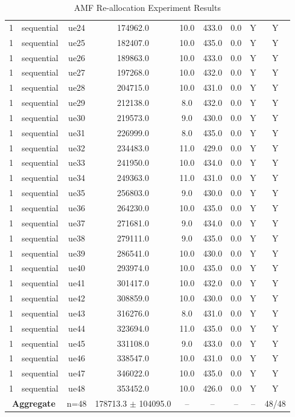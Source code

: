 \begin{table}[ht]
\begin{tabular}{|c|c|c|c|c|c|c|c|c|}
1 & sequential & ue24 & 174962.0 & 10.0 & 433.0 & 0.0 & Y & Y \\
1 & sequential & ue25 & 182407.0 & 10.0 & 435.0 & 0.0 & Y & Y \\
1 & sequential & ue26 & 189863.0 & 10.0 & 433.0 & 0.0 & Y & Y \\
1 & sequential & ue27 & 197268.0 & 10.0 & 432.0 & 0.0 & Y & Y \\
1 & sequential & ue28 & 204715.0 & 10.0 & 431.0 & 0.0 & Y & Y \\
1 & sequential & ue29 & 212138.0 & 8.0 & 432.0 & 0.0 & Y & Y \\
1 & sequential & ue30 & 219573.0 & 9.0 & 430.0 & 0.0 & Y & Y \\
1 & sequential & ue31 & 226999.0 & 8.0 & 435.0 & 0.0 & Y & Y \\
1 & sequential & ue32 & 234483.0 & 11.0 & 429.0 & 0.0 & Y & Y \\
1 & sequential & ue33 & 241950.0 & 10.0 & 434.0 & 0.0 & Y & Y \\
1 & sequential & ue34 & 249363.0 & 11.0 & 431.0 & 0.0 & Y & Y \\
1 & sequential & ue35 & 256803.0 & 9.0 & 430.0 & 0.0 & Y & Y \\
1 & sequential & ue36 & 264230.0 & 10.0 & 435.0 & 0.0 & Y & Y \\
1 & sequential & ue37 & 271681.0 & 9.0 & 434.0 & 0.0 & Y & Y \\
1 & sequential & ue38 & 279111.0 & 9.0 & 435.0 & 0.0 & Y & Y \\
1 & sequential & ue39 & 286541.0 & 10.0 & 430.0 & 0.0 & Y & Y \\
1 & sequential & ue40 & 293974.0 & 10.0 & 435.0 & 0.0 & Y & Y \\
1 & sequential & ue41 & 301417.0 & 10.0 & 432.0 & 0.0 & Y & Y \\
1 & sequential & ue42 & 308859.0 & 10.0 & 430.0 & 0.0 & Y & Y \\
1 & sequential & ue43 & 316276.0 & 8.0 & 431.0 & 0.0 & Y & Y \\
1 & sequential & ue44 & 323694.0 & 11.0 & 435.0 & 0.0 & Y & Y \\
1 & sequential & ue45 & 331108.0 & 9.0 & 433.0 & 0.0 & Y & Y \\
1 & sequential & ue46 & 338547.0 & 10.0 & 431.0 & 0.0 & Y & Y \\
1 & sequential & ue47 & 346022.0 & 10.0 & 435.0 & 0.0 & Y & Y \\
1 & sequential & ue48 & 353452.0 & 10.0 & 426.0 & 0.0 & Y & Y \\
\multicolumn{2}{|c|}{\textbf{Aggregate}} & n=48 & 178713.3 $\pm$ 104095.0 & -- & -- & -- & -- & 48/48 \\
\hline
\end{tabular}
\caption{AMF Re-allocation Experiment Results}
\label{tab:amf_realloc}
\end{table}
